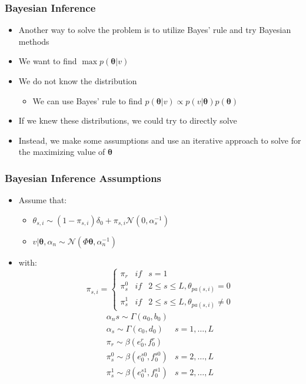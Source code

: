 \documentclass{beamer}
\newcommand{\bftheta}{\mathbf{\theta}}
\begin{document}
\begin{frame}
  \frametitle{Bayesian Inference}
  \begin{itemize}
  \item Another way to solve the problem is to utilize Bayes' rule and
    try Bayesian methods
  \item We want to find $\max p(\bftheta|v)$
  \item We do not know the distribution
    \begin{itemize}
      \item We can use Bayes' rule to find $p(\bftheta|v)
        \propto p(v|\bftheta)p(\bftheta)$
    \end{itemize}
  \item If we knew these distributions, we could try to directly
    solve
  \item Instead, we make some assumptions and use an iterative approach
  to solve for the maximizing value of $\bftheta$
  \end{itemize}
\end{frame}


\begin{frame}
  \frametitle{Bayesian Inference Assumptions}
  \begin{itemize}
  \item Assume that:
    \begin{itemize}
    \item $\theta_{s,i} \sim (1-\pi_{s,i})\delta_0 + \pi_{s,i} \mathcal{N}(0,\alpha_s^{-1})$
    \item $v|\bftheta, \alpha_n \sim
      \mathcal{N}(\Phi\bftheta,\alpha_n^{-1})$
    \end{itemize}
    \item with:
      \[   \pi_{s,i} = \left\{
      \begin{array}{ccc}
        \pi_r & if & s = 1  \\ 
        \pi_s^0 & if & 2 \leq s \leq L, \theta_{pa(s,i)} = 0  \\ 
        \pi_s^1 & if & 2 \leq s \leq L, \theta_{pa(s,i)} \neq 0 
      \end{array} \right. \]
      \[\begin{array}{cc}
      \alpha_ns \sim \Gamma(a_0,b_0) & \\
      \alpha_s \sim \Gamma(c_0,d_0) & s=1,\ldots,L \\
      \pi_r \sim \beta(e_0^r,f_0^r) & \\
      \pi_s^0 \sim \beta(e_0^{s0},f_0^{s0}) & s=2,\ldots,L \\
      \pi_s^1 \sim \beta(e_0^{s1},f_0^{s1}) & s=2,\ldots,L
      \end{array} \]
  \end{itemize}
\end{frame}
\end{document}
